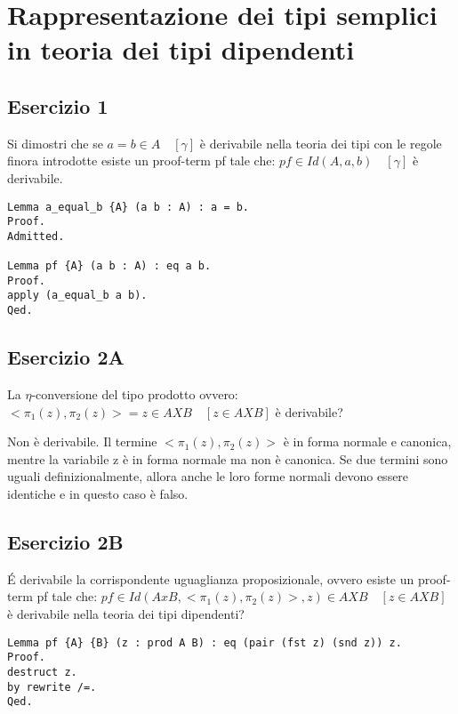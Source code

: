 \newpage
\section{Rappresentazione dei tipi semplici in teoria dei tipi dipendenti}

\subsection{Esercizio 1}

Si dimostri che se $a = b \in A \quad [\gamma]$ è derivabile nella teoria dei tipi
con le regole finora introdotte esiste un proof-term pf tale che:
$pf \in Id(A, a, b) \quad [\gamma]$ è derivabile.

\begin{lstlisting}[language=Coq]
Lemma a_equal_b {A} (a b : A) : a = b.
Proof.
Admitted.

Lemma pf {A} (a b : A) : eq a b.
Proof.
apply (a_equal_b a b).
Qed.
\end{lstlisting}

\subsection{Esercizio 2A}

La $\eta$-conversione del tipo prodotto ovvero:
$<\pi_1(z),\pi_2(z)> = z \in A X B \quad [z \in A X B]$
è derivabile?

Non è derivabile. Il termine $<\pi_1(z),\pi_2(z)>$ è in forma normale e canonica,
mentre la variabile z è in forma normale ma non è canonica.
Se due termini sono uguali definizionalmente, allora anche le loro forme normali
devono essere identiche e in questo caso è falso.

\subsection{Esercizio 2B}

\'{E} derivabile la corrispondente uguaglianza proposizionale, ovvero esiste un
proof-term pf tale che:
$pf \in Id(A x B, <\pi_1(z), \pi_2(z)>, z ) \in A X B \quad [z \in A X B]$ è
derivabile nella teoria dei tipi dipendenti?

\begin{lstlisting}[language=Coq]
Lemma pf {A} {B} (z : prod A B) : eq (pair (fst z) (snd z)) z.
Proof.
destruct z.
by rewrite /=.
Qed.
\end{lstlisting}

